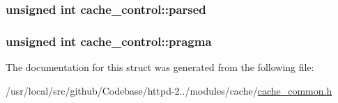 \subsubsection[{\texorpdfstring{parsed}{parsed}}]{\setlength{\rightskip}{0pt plus 5cm}unsigned {\bf int} cache\+\_\+control\+::parsed}\hypertarget{structcache__control_a386401082305485525836ed568c6b46a}{}\label{structcache__control_a386401082305485525836ed568c6b46a}
\subsubsection[{\texorpdfstring{pragma}{pragma}}]{\setlength{\rightskip}{0pt plus 5cm}unsigned {\bf int} cache\+\_\+control\+::pragma}\hypertarget{structcache__control_a60d185604c017054a36964edaadd0220}{}\label{structcache__control_a60d185604c017054a36964edaadd0220}


The documentation for this struct was generated from the following file\+:\begin{DoxyCompactItemize}
\item 
/usr/local/src/github/\+Codebase/httpd-\/2../modules/cache/\hyperlink{cache__common_8h}{cache\+\_\+common.\+h}\end{DoxyCompactItemize}
